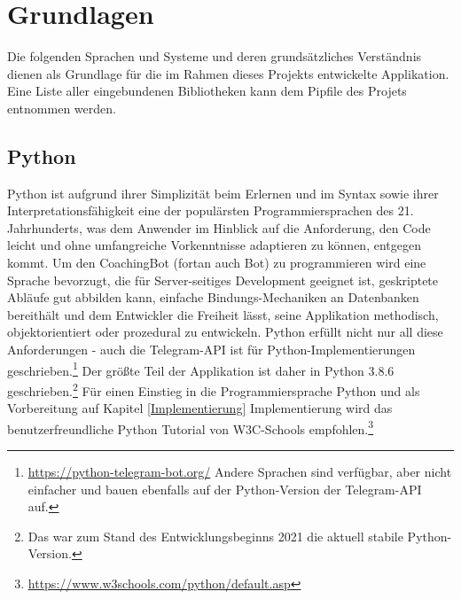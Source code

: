 \chapter{Grundlagen} \label{Grundlagen}
Die folgenden Sprachen und Systeme und deren grundsätzliches Verständnis dienen als Grundlage für die im Rahmen dieses Projekts entwickelte Applikation. Eine Liste aller eingebundenen Bibliotheken kann dem Pipfile des Projets entnommen werden. 


    \section{Python}
        Python ist aufgrund ihrer Simplizität beim Erlernen und im Syntax sowie ihrer Interpretationsfähigkeit eine der populärsten Programmiersprachen des 21. Jahrhunderts, was dem Anwender im Hinblick auf die Anforderung, den Code leicht und ohne umfangreiche Vorkenntnisse adaptieren zu können, entgegen kommt. Um den CoachingBot (fortan auch \glqq Bot\grqq) zu programmieren wird eine Sprache bevorzugt, die für Server-seitiges Development geeignet ist, geskriptete Abläufe gut abbilden kann, einfache Bindungs-Mechaniken an Datenbanken bereithält und dem Entwickler die Freiheit lässt, seine Applikation methodisch, objektorientiert oder prozedural zu entwickeln.\cite{python} Python erfüllt nicht nur all diese Anforderungen - auch die Telegram-API ist für Python-Implementierungen geschrieben.\footnote{\url{https://python-telegram-bot.org/} Andere Sprachen sind verfügbar, aber nicht einfacher und bauen ebenfalls auf der Python-Version der Telegram-API auf.}
        Der größte Teil der Applikation ist daher in Python 3.8.6 \cite{python3.8.6} geschrieben.\footnote{Das war zum Stand des Entwicklungsbeginns 2021 die aktuell stabile Python-Version.} 
        Für einen Einstieg in die Programmiersprache Python und als Vorbereitung auf Kapitel \ref{Implementierung} Implementierung wird das benutzerfreundliche Python Tutorial von W3C-Schools empfohlen.\footnote{\url{https://www.w3schools.com/python/default.asp}}

